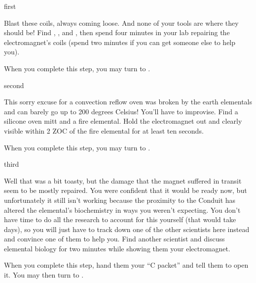 \documentclass[notebook]{elementals}
\begin{document}

\startnotebook{\nElectromagnet{}}

\begin{page}{first}

Blast these coils, always coming loose. And none of your tools are where they should be! Find \iTungsten{}, \iWireTightener{}, and \iWireStripper{}, then spend four minutes in your lab repairing the electromagnet's coils (spend two minutes if you can get someone else to help you).

When you complete this step, you may turn to .

\end{page}

\begin{page}{second}

This sorry excuse for a convection reflow oven was broken by the earth elementals and can barely go up to 200 degrees Celsius! You'll have to improvise. Find a silicone oven mitt and a fire elemental. Hold the electromagnet out and clearly visible within 2 ZOC of the fire elemental for at least ten seconds.

When you complete this step, you may turn to .

\end{page}

\begin{page}{third}

Well that was a bit toasty, but the damage that the magnet suffered in transit seem to be mostly repaired. You were confident that it would be ready now, but unfortunately it still isn't working because the proximity to the Conduit has altered the elemental's biochemistry in ways you weren't expecting. You don't have time to do all the research to account for this yourself (that would take days), so you will just have to track down one of the other scientists here instead and convince one of them to help you. Find another scientist and discuss elemental biology for two minutes while showing them your electromagnet.

When you complete this step, hand them your ``C packet'' and tell them to open it. You may then turn to .

\end{page}
\end{document}
